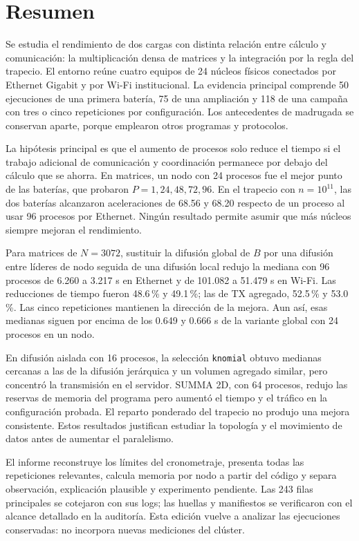 \section*{Resumen}

Se estudia el rendimiento de dos cargas con distinta relación entre cálculo y comunicación: la multiplicación densa de matrices y la integración por la regla del trapecio. El entorno reúne cuatro equipos de 24 núcleos físicos conectados por Ethernet Gigabit y por Wi-Fi institucional. La evidencia principal comprende 50 ejecuciones de una primera batería, 75 de una ampliación y 118 de una campaña con tres o cinco repeticiones por configuración. Los antecedentes de madrugada se conservan aparte, porque emplearon otros programas y protocolos.

La hipótesis principal es que el aumento de procesos solo reduce el tiempo si el trabajo adicional de comunicación y coordinación permanece por debajo del cálculo que se ahorra. En matrices, un nodo con 24 procesos fue el mejor punto de las baterías, que probaron $P=1,24,48,72,96$. En el trapecio con $n=10^{11}$, las dos baterías alcanzaron aceleraciones de 68.56 y 68.20 respecto de un proceso al usar 96 procesos por Ethernet. Ningún resultado permite asumir que más núcleos siempre mejoran el rendimiento.

Para matrices de $N=3072$, sustituir la difusión global de $B$ por una difusión entre líderes de nodo seguida de una difusión local redujo la mediana con 96 procesos de 6.260 a 3.217 s en Ethernet y de 101.082 a 51.479 s en Wi-Fi. Las reducciones de tiempo fueron 48.6\,\% y 49.1\,\%; las de TX agregado, 52.5\,\% y 53.0\,\%. Las cinco repeticiones mantienen la dirección de la mejora. Aun así, esas medianas siguen por encima de los 0.649 y 0.666 s de la variante global con 24 procesos en un nodo.

En difusión aislada con 16 procesos, la selección \texttt{knomial} obtuvo medianas cercanas a las de la difusión jerárquica y un volumen agregado similar, pero concentró la transmisión en el servidor. SUMMA 2D, con 64 procesos, redujo las reservas de memoria del programa pero aumentó el tiempo y el tráfico en la configuración probada. El reparto ponderado del trapecio no produjo una mejora consistente. Estos resultados justifican estudiar la topología y el movimiento de datos antes de aumentar el paralelismo.

El informe reconstruye los límites del cronometraje, presenta todas las repeticiones relevantes, calcula memoria por nodo a partir del código y separa observación, explicación plausible y experimento pendiente. Las 243 filas principales se cotejaron con sus logs; las huellas y manifiestos se verificaron con el alcance detallado en la auditoría. Esta edición vuelve a analizar las ejecuciones conservadas: no incorpora nuevas mediciones del clúster.

